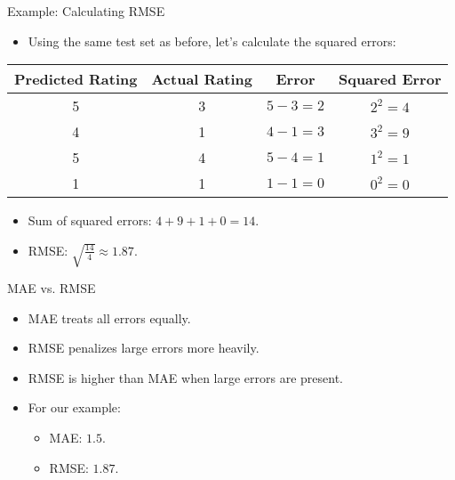\documentclass{beamer}
\begin{document}
\begin{frame}{Example: Calculating RMSE}
\begin{itemize}
    \item Using the same test set as before, let's calculate the squared errors:
\end{itemize}

\begin{center}
\begin{tabular}{|c|c|c|c|}
\hline
\textbf{Predicted Rating} & \textbf{Actual Rating} & \textbf{Error} & \textbf{Squared Error} \\ \hline
5 & 3 & \( 5 - 3 = 2 \) & \( 2^2 = 4 \) \\ \hline
4 & 1 & \( 4 - 1 = 3 \) & \( 3^2 = 9 \) \\ \hline
5 & 4 & \( 5 - 4 = 1 \) & \( 1^2 = 1 \) \\ \hline
1 & 1 & \( 1 - 1 = 0 \) & \( 0^2 = 0 \) \\ \hline
\end{tabular}
\end{center}

\begin{itemize}
    \item Sum of squared errors: \( 4 + 9 + 1 + 0 = 14 \).
    \item RMSE: \( \sqrt{\frac{14}{4}} \approx 1.87 \).
\end{itemize}
\end{frame}

\begin{frame}{MAE vs. RMSE}
\begin{itemize}
    \item MAE treats all errors equally.
    \item RMSE penalizes large errors more heavily.
    \item RMSE is higher than MAE when large errors are present.
\end{itemize}

\begin{itemize}
    \item For our example:
    \begin{itemize}
        \item MAE: \( 1.5 \).
        \item RMSE: \( 1.87 \).
    \end{itemize}
\end{itemize}
\end{frame}
\end{document}
